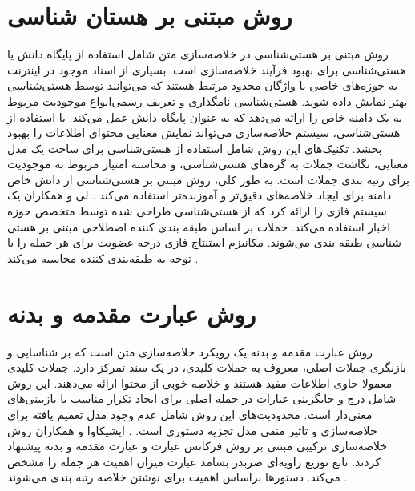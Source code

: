 \section{روش مبتنی بر هستان شناسی}
روش مبتنی بر هستی‌شناسی در خلاصه‌سازی متن شامل استفاده از پایگاه دانش یا هستی‌شناسی برای بهبود فرآیند خلاصه‌سازی است. بسیاری از اسناد موجود در اینترنت به حوزه‌های خاصی با واژگان محدود مرتبط هستند که می‌توانند توسط هستی‌شناسی بهتر نمایش داده شوند. هستی‌شناسی نامگذاری و تعریف رسمی‌انواع موجودیت مربوط به یک دامنه خاص را ارائه می‌دهد که به عنوان پایگاه دانش عمل می‌کند. با استفاده از هستی‌شناسی، سیستم خلاصه‌سازی می‌تواند نمایش معنایی محتوای اطلاعات را بهبود بخشد. تکنیک‌های این روش شامل استفاده از هستی‌شناسی برای ساخت یک مدل معنایی، نگاشت جملات به گره‌های هستی‌شناسی، و محاسبه امتیاز مربوط به موجودیت برای رتبه بندی جملات است. به طور کلی، روش مبتنی بر هستی‌شناسی از دانش خاص دامنه برای ایجاد خلاصه‌های دقیق‌تر و آموزنده‌تر استفاده می‌کند
\cite{andhale2016overview}.
لی و همکاران  یک سیستم فازی را ارائه کرد که از هستی‌شناسی طراحی شده توسط متخصص حوزه اخبار استفاده می‌کند. جملات بر اساس طبقه بندی کننده اصطلاحی مبتنی بر هستی شناسی طبقه بندی می‌شوند. مکانیزم استنتاج فازی درجه عضویت برای هر جمله را با توجه به طبقه‌بندی کننده محاسبه می‌کند
\cite{lee2005fuzzy}.

\section{روش  عبارت مقدمه و بدنه}

روش عبارت مقدمه و بدنه یک رویکرد خلاصه‌سازی متن است که بر شناسایی و بازنگری جملات اصلی، معروف به جملات کلیدی، در یک سند تمرکز دارد. جملات کلیدی معمولا حاوی اطلاعات مفید هستند و خلاصه خوبی از محتوا ارائه می‌دهند. این روش شامل درج و جایگزینی عبارات در جمله اصلی برای ایجاد تکرار مناسب با بازبینی‌های معنی‌دار است. محدودیت‌های این روش شامل عدم وجود مدل تعمیم یافته برای خلاصه‌سازی و تاثیر منفی مدل تجزیه دستوری است.
\cite{andhale2016overview}.
ایشیکاوا و همکاران  روش خلاصه‌سازی ترکیبی مبتنی بر روش فرکانس عبارت
 و عبارت مقدمه و بدنه پیشنهاد کردند. تابع توزیع زاویه‌ای ضربدر بسامد عبارت  میزان اهمیت هر جمله را مشخص می‌کند. دستورها براساس اهمیت برای نوشتن خلاصه رتبه بندی می‌شوند
\cite{Ishikawa2001HybridTS}.

